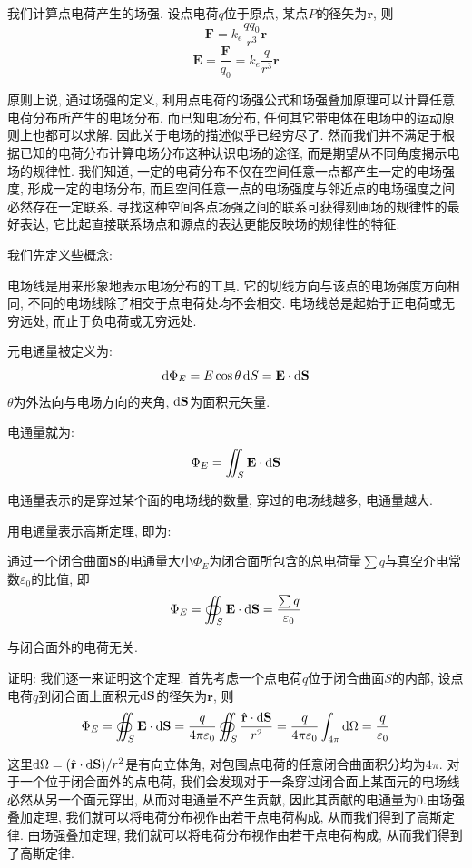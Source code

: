 我们计算点电荷产生的场强. 设点电荷$q$位于原点, 某点$P$的径矢为$\mathbf{r}$, 则
\[
\mathbf{F} = k_e \frac{q q_0}{r^3}\mathbf{r}
\]
\[
\mathbf{E} = \frac{\mathbf{F}}{q_0} = k_e \frac{q}{r^3}\mathbf{r}
\]

原则上说, 通过场强的定义, 利用点电荷的场强公式和场强叠加原理可以计算任意电荷分布所产生的电场分布. 而已知电场分布, 任何其它带电体在电场中的运动原则上也都可以求解. 因此关于电场的描述似乎已经穷尽了. 然而我们并不满足于根据已知的电荷分布计算电场分布这种认识电场的途径, 而是期望从不同角度揭示电场的规律性. 我们知道, 一定的电荷分布不仅在空间任意一点都产生一定的电场强度, 形成一定的电场分布, 而且空间任意一点的电场强度与邻近点的电场强度之间必然存在一定联系. 寻找这种空间各点场强之间的联系可获得刻画场的规律性的最好表达, 它比起直接联系场点和源点的表达更能反映场的规律性的特征.

我们先定义些概念:
\begin{definition}
  电场线是用来形象地表示电场分布的工具. 它的切线方向与该点的电场强度方向相同, 不同的电场线除了相交于点电荷处均不会相交. 电场线总是起始于正电荷或无穷远处, 而止于负电荷或无穷远处.

  元电通量被定义为:
  \[
  \mathop{}\!\mathrm{d} \Phi_E = E \cos\theta \mathop{}\!\mathrm{d} S = \mathbf{E} \cdot \mathop{}\!\mathrm{d}\mathbf{S}
  \]
$\theta$为外法向与电场方向的夹角, $\mathop{}\!\mathrm{d}\mathbf{S}$为面积元矢量.

电通量就为:
  \[
  \Phi_E = \iint_S \mathbf{E} \cdot \mathop{}\!\mathrm{d}\mathbf{S}
  \]

电通量表示的是穿过某个面的电场线的数量, 穿过的电场线越多, 电通量越大.
\end{definition}
\begin{theorem}[高斯定律]
用电通量表示高斯定理, 即为:

通过一个闭合曲面$\mathbf{S}$的电通量大小$\Phi_E$为闭合面所包含的总电荷量$\sum q$与真空介电常数$\varepsilon_0$的比值, 即
  \[
  \Phi_E = \oiint_S \mathbf{E} \cdot \mathop{}\!\mathrm{d}\mathbf{S} = \frac{\sum q}{\varepsilon_0}
  \]

  与闭合面外的电荷无关.
\end{theorem}

证明: 我们逐一来证明这个定理. 首先考虑一个点电荷$q$位于闭合曲面$S$的内部, 设点电荷$q$到闭合面上面积元$\mathop{}\!\mathrm{d}\mathbf{S}$的径矢为$\mathbf{r}$, 则
  \[
  \Phi_E = \oiint_S \mathbf{E} \cdot \mathop{}\!\mathrm{d}\mathbf{S}= \frac{q}{4\pi\varepsilon_0}\oiint_S \frac{\hat{\mathbf r}\cdot\mathop{}\!\mathrm{d}\mathbf S}{r^2} = \frac{q}{4\pi\varepsilon_0}\int_{4\pi}\mathop{}\!\mathrm{d}\Omega
  = \frac{q}{\varepsilon_0}
  \]

这里$\mathop{}\!\mathrm{d}\Omega=(\hat{\mathbf r}\cdot\mathop{}\!\mathrm{d}\mathbf S)/r^2$是有向立体角, 对包围点电荷的任意闭合曲面积分均为$4\pi$. 对于一个位于闭合面外的点电荷, 我们会发现对于一条穿过闭合面上某面元的电场线必然从另一个面元穿出, 从而对电通量不产生贡献, 因此其贡献的电通量为0.由场强叠加定理, 我们就可以将电荷分布视作由若干点电荷构成, 从而我们得到了高斯定律.
由场强叠加定理, 我们就可以将电荷分布视作由若干点电荷构成, 从而我们得到了高斯定律.

